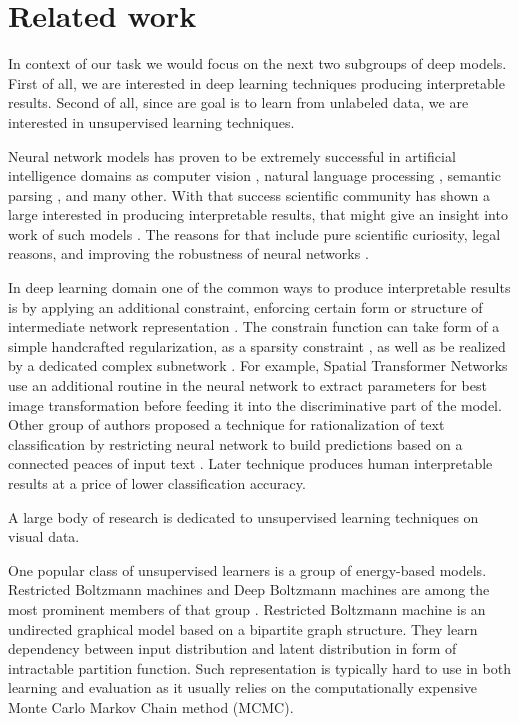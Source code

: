 
\chapter{Related work}\label{ch:rewo}

In context of our task we would focus on the next two subgroups of deep models.
First of all, we are interested in deep learning techniques producing interpretable results.
Second of all, since are goal is to learn from unlabeled data, we are interested in unsupervised learning techniques.

Neural network models has proven to be extremely successful in artificial intelligence domains as computer vision \cite{ILSVRC15}, natural language processing \cite{NIPS2013_5021}, semantic parsing \cite{bordes2012}, and many other.
With that success scientific community has shown a large interested in producing interpretable results, that might give an insight into work of such models \cite{Yosinski2015, Mahendran2014, Zeiler2014, Lei2016}.
The reasons for that include pure scientific curiosity, legal reasons, and improving the robustness of neural networks \cite{Goodfellow2015}.

In deep learning domain one of the common ways to produce interpretable results is by applying an additional constraint, enforcing certain form or structure of intermediate network representation  \cite{Jaderberg2015, Lei2016, Kulkarni2015}.
The constrain function can take form of a simple handcrafted regularization, as a sparsity constraint \cite{Ng2011}, as well as be realized by a dedicated complex subnetwork \cite{Lei2016, Li2015}.
For example, Spatial Transformer Networks \cite{Jaderberg2015} use an additional routine in the neural network to extract parameters for best image transformation before feeding it into the discriminative part of the model.
Other group of authors proposed a technique for rationalization of text classification by restricting neural network to build predictions based on a connected peaces of input text \cite{Lei2016}.
Later technique produces human interpretable results at a price of lower classification accuracy.

A large body of research is dedicated to unsupervised learning techniques on visual data.

One popular class of unsupervised learners is a group of energy-based models.
Restricted Boltzmann machines and Deep Boltzmann machines are among the most prominent members of that group \cite{Ackley1985, Salakhutdinov2009}.
Restricted Boltzmann machine is an undirected graphical model based on a bipartite graph structure.
They learn dependency between input distribution and latent distribution in form of intractable partition function.
Such representation is typically hard to use in both learning and evaluation as it usually relies on the computationally expensive Monte Carlo Markov Chain method (MCMC).

